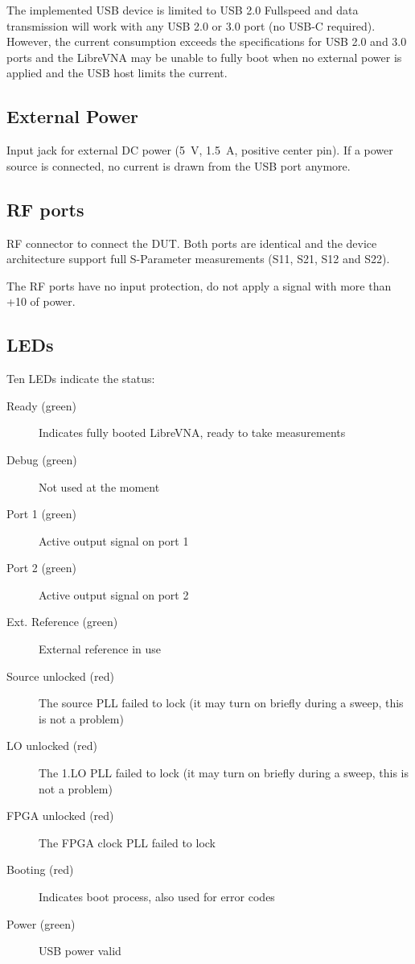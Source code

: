 \documentclass[a4paper,11pt]{article}
\newcommand\danger[1][5ex]{%
  \renewcommand\stacktype{L}%
  \scaleto{\stackon[1.3pt]{\color{red}$\triangle$}{\tiny !}}{#1}%
}
\newenvironment{important}[1][]{%
   \begin{mdframed}[%
      backgroundcolor={red!15}, hidealllines=true,
      skipabove=0.7\baselineskip, skipbelow=0.7\baselineskip,
      splitbottomskip=2pt, splittopskip=4pt, #1]%
   \makebox[0pt]{%
      \smash{%
         \hspace*{-45pt}%
         \raisebox{-5pt}{%
            {\danger}%
         }%
      }%
   }%
}{\end{mdframed}}
\newcommand{\vna}{LibreVNA}
\begin{document}
The implemented USB device is limited to USB 2.0 Fullspeed and data transmission will work with any USB 2.0 or 3.0 port (no USB-C required). However, the current consumption exceeds the specifications for USB 2.0 and 3.0 ports and the \vna{} may be unable to fully boot when no external power is applied and the USB host limits the current.
\subsection{External Power}
Input jack for external DC power (\SI{5}{\volt}, \SI{1.5}{\ampere}, positive center pin). If a power source is connected, no current is drawn from the USB port anymore.
\subsection{RF ports}
RF connector to connect the DUT. Both ports are identical and the device architecture support full S-Parameter measurements (S11, S21, S12 and S22).
\begin{important}
The RF ports have no input protection, do not apply a signal with more than +\SI{10}{\dBm} of power.
\end{important}
\subsection{LEDs}
Ten LEDs indicate the status:
\begin{description}
\item [Ready (green)] Indicates fully booted \vna{}, ready to take measurements
\item [Debug (green)] Not used at the moment
\item [Port 1 (green)] Active output signal on port 1
\item [Port 2 (green)] Active output signal on port 2
\item [Ext. Reference (green)] External reference in use
\item [Source unlocked (red)] The source PLL failed to lock (it may turn on briefly during a sweep, this is not a problem)
\item [LO unlocked (red)] The 1.LO PLL failed to lock (it may turn on briefly during a sweep, this is not a problem)
\item [FPGA unlocked (red)] The FPGA clock PLL failed to lock
\item [Booting (red)] Indicates boot process, also used for error codes
\item [Power (green)] USB power valid
\end{description}
\end{document}
